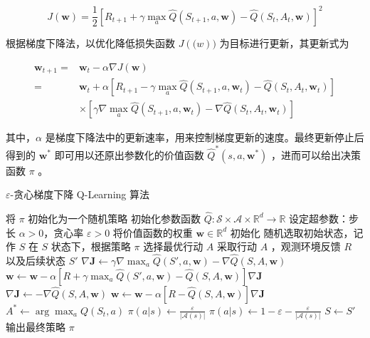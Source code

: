 \begin{equation}
    J(\boldsymbol{w}) = \frac{1}{2}\left[R_{t+1}+\gamma\max_a\widehat{Q}(S_{t+1},a,\boldsymbol{w})-\widehat{Q}(S_t,A_t,\boldsymbol{w})\right]^2
\end{equation}

根据梯度下降法，以优化降低损失函数 $J(\boldsymbol(w))$ 为目标进行更新，其更新式为

\begin{equation}\label{eq:qlearninggrad}
\begin{aligned} \boldsymbol{w}_{t+1} =&\boldsymbol{w}_{t}-\alpha\nabla J(\boldsymbol{w}) \\ =&\boldsymbol{w}_{t}+\alpha\left[R_{t+1} - \gamma \max _{a} \widehat{Q}\left(S_{t+1}, a, \boldsymbol{w}_{t}\right)-\widehat{Q}\left(S_{t}, A_{t}, \boldsymbol{w}_{t}\right)\right]\\&\times\left[\gamma\nabla \max _{a} \widehat{Q}\left(S_{t+1}, a, \boldsymbol{w}_{t}\right)-\nabla \widehat{Q}\left(S_{t}, A_{t}, \boldsymbol{w}_{t}\right)\right] \end{aligned}
\end{equation}

其中，$\alpha$ 是梯度下降法中的更新速率，用来控制梯度更新的速度。最终更新停止后得到的 $\boldsymbol{w}^*$ 即可用以还原出参数化的价值函数 $\widehat{Q}^*(s,a,\boldsymbol{w}^*)$ ，进而可以给出决策函数 $\pi$ 。

\begin{algorithm}[H]
    \caption{$\varepsilon$-贪心梯度下降 Q-Learning 算法}
    \begin{algorithmic}[1] %
        \State 将 $\pi$ 初始化为一个随机策略
        \State 初始化参数函数 $\widehat{Q} : \mathcal{S} \times \mathcal{A} \times \mathbb{R}^{d} \rightarrow \mathbb{R}$
        \State 设定超参数：步长 $\alpha>0$，贪心率 $\varepsilon>0$
        \State 将价值函数的权重 $\boldsymbol{w}\in\mathbb{R}^d$ 初始化
        \Loop
        \State 随机选取初始状态，记作 $S$
        \Repeat
        \State 在 $S$ 状态下，根据策略 $\pi$ 选择最优行动 $A$
        \State 采取行动 $A$ ，观测环境反馈 $R$ 以及后续状态 $S'$
        \State $\nabla\boldsymbol{J}\leftarrow \gamma\nabla\max_a\widehat{Q}(S',a,\boldsymbol{w})-\nabla\widehat{Q}(S,A,\boldsymbol{w})$
        \State $\boldsymbol{w}\leftarrow\boldsymbol{w} - \alpha\left[R+\gamma\max_a\widehat{Q}(S',a,\boldsymbol{w})-\widehat{Q}(S,A,\boldsymbol{w})\right]\nabla\boldsymbol{J}$
        \Else
        \State $\nabla\boldsymbol{J}\leftarrow -\nabla\widehat{Q}(S,A,\boldsymbol{w})$
        \State $\boldsymbol{w}\leftarrow\boldsymbol{w} - \alpha\left[R-\widehat{Q}(S,A,\boldsymbol{w})\right]\nabla\boldsymbol{J}$
        \EndIf
        \State $A^*\leftarrow\arg\max_aQ(S_t,a)$
        \State $\pi(a|s)\leftarrow \frac{\varepsilon}{|\mathcal A(s)|}$
        \Else
        \State $\pi(a|s)\leftarrow 1-\varepsilon-\frac{\varepsilon}{|\mathcal A(s)|}$
        \EndIf
        \EndFor
        \State $S\leftarrow S'$
        \EndLoop
        \State
        \State 输出最终策略 $\pi$
    \end{algorithmic}
\end{algorithm}

